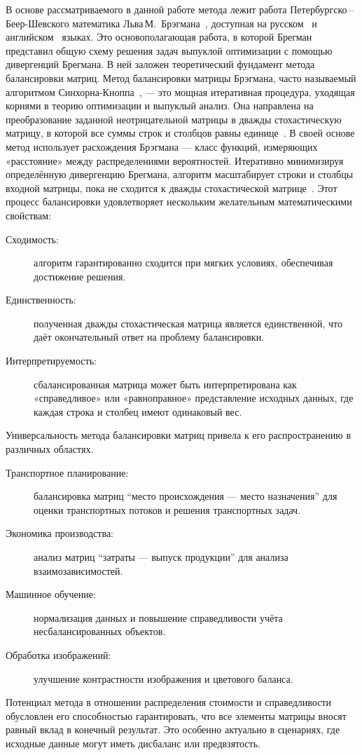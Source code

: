 \documentclass[12pt]{scrartcl}
\begin{document}
В основе рассматриваемого в данной работе метода лежит работа Петербургско\,--\,Беер-Шевского  математика Льва\,М.~Брэгмана~\cite{BregmanMemory}, доступная на русском~\cite{Bregman1967rus} и английском~\cite{Bregman1967} языках. Это основополагающая работа, в которой Брегман представил общую схему решения задач выпуклой оптимизации с помощью дивергенций Брегмана. В ней заложен теоретический фундамент метода балансировки матриц. Метод балансировки матрицы Брэгмана, часто называемый алгоритмом Синхорна-Кноппа~\cite{Sinkhorn1967}, --- это мощная итеративная процедура, уходящая корнями в теорию оптимизации и выпуклый анализ. Она направлена на преобразование заданной неотрицательной матрицы в дважды стохастическую матрицу, в которой все суммы строк и столбцов равны единице~\cite{Pourmand2021}. В своей основе метод использует расхождения Брэгмана --- класс функций, измеряющих «расстояние» между распределениями вероятностей. Итеративно минимизируя определённую дивергенцию Брегмана, алгоритм масштабирует строки и столбцы входной матрицы, пока не сходится к дважды стохастической матрице~\cite{Censor1997}. Этот процесс балансировки удовлетворяет нескольким желательным математическими свойствам:
\begin{description}
    \item[Сходимость:] алгоритм гарантированно сходится при мягких условиях, обеспечивая достижение решения.
    \item[Единственность:] полученная дважды стохастическая матрица является единственной, что даёт окончательный ответ на проблему балансировки.
    \item[Интерпретируемость:] сбалансированная матрица может быть интерпретирована как «справедливое» или «равноправное» представление исходных данных, где каждая строка и столбец имеют одинаковый вес.
\end{description}
Универсальность метода балансировки матриц привела к его распространению в различных областях.
\begin{description}
    \item[Транспортное планирование:] балансировка матриц ``место происхождения --- место назначения'' для оценки транспортных потоков и решения транспортных задач.
    \item[Экономика производства:] анализ матриц ``затраты --- выпуск продукции'' для анализа взаимозависимостей.
    \item[Машинное обучение:] нормализация данных и повышение справедливости учёта несбалансированных объектов.
    \item[Обработка изображений:] улучшение контрастности изображения и цветового баланса.
\end{description}
Потенциал метода в отношении распределения стоимости и справедливости обусловлен его способностью гарантировать, что все элементы матрицы вносят равный вклад в конечный результат. Это особенно актуально в сценариях, где исходные данные могут иметь дисбаланс или предвзятость.
\end{document}
